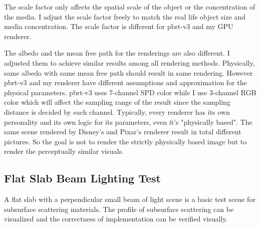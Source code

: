 \documentclass[letterpaper,12pt]{article}
\begin{document}
The scale factor only affects the spatial scale of the object or the concentration of the media. I adjust the scale factor freely to match the real life object size and media concentration. The scale factor is different for pbrt-v3 and my GPU renderer.

The albedo and the mean free path for the renderings are also different. I adjusted them to achieve similar results among all rendering methods. Physically, same albedo with same mean free path should result in same rendering. However pbrt-v3 and my renderer have different assumptions and approximation for the physical parameters. pbrt-v3 uses 7-channel SPD color while I use 3-channel RGB color which will affect the sampling range of the result since the sampling distance is decided by each channel. Typically, every renderer has its own personality and its own logic for its parameters, even it's "physically based". The same scene rendered by Disney's and Pixar's renderer result in total different pictures. So the goal is not to render the strictly physically based image but to render the perceptually similar visuals. 

\subsection{Flat Slab Beam Lighting Test}

A flat slab with a perpendicular small beam of light scene is a basic test scene for subsurface scattering materials. The profile of subsurface scattering can be visualized and the correctness of implementation can be verified visually.
\end{document}
